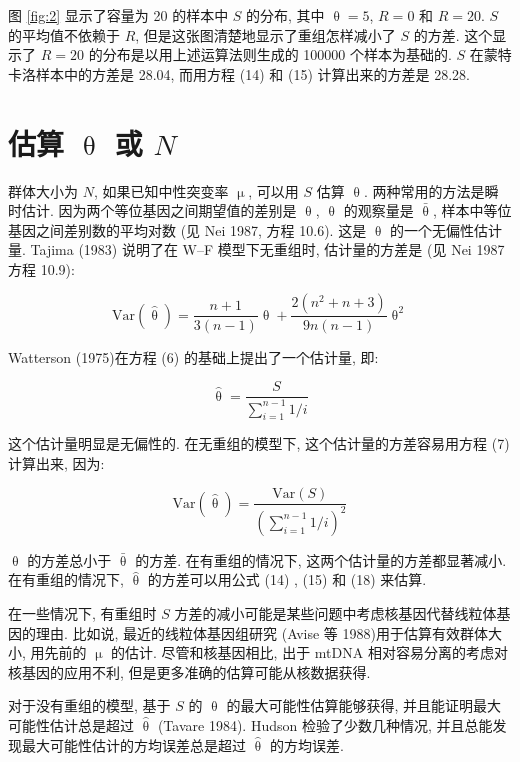 \documentclass[
    12pt,%
    ]{article}
\begin{document}
图 \ref{fig:2} 显示了容量为 20 的样本中 $S$ 的分布, 其中 $\uptheta =5$, $R=0$ 和 $R=20$. $S$ 的平均值不依赖于
$R$, 但是这张图清楚地显示了重组怎样减小了 $S$ 的方差. 这个显示了 $R=20$ 的分布是以用上述运算法则生成的 100000
个样本为基础的. $S$ 在蒙特卡洛样本中的方差是 28.04, 而用方程 (14) 和 (15) 计算出来的方差是 28.28.

\section{估算 $\uptheta$ 或 $N$}

群体大小为 $N$, 如果已知中性突变率 $\upmu$, 可以用 $S$ 估算 $\uptheta$. 两种常用的方法是瞬时估计.
因为两个等位基因之间期望值的差别是 $\uptheta$, $\uptheta$ 的观察量是 $\overset{‾}{\uptheta}$,
样本中等位基因之间差别数的平均对数 (见 Nei 1987, 方程 10.6). 这是 $\uptheta$ 的一个无偏性估计量. Tajima (1983) 说明了在
W--F 模型下无重组时, 估计量的方差是 (见 Nei 1987 方程 10.9):

\begin{equation} \label{eq:16}
    \text{Var}(\hat{\uptheta})=\frac{n+1}{3(n-1)}\uptheta + \frac{2(n^{2}+n+3)}{9n(n-1)}\uptheta^{2}
\end{equation}

Watterson (1975)在方程 (6) 的基础上提出了一个估计量, 即:

\begin{equation} \label{eq:17}
    \hat{\uptheta}=\frac{S}{\sum_{i=1}^{n-1}1/i}
\end{equation}

这个估计量明显是无偏性的. 在无重组的模型下, 这个估计量的方差容易用方程 (7) 计算出来, 因为:

\begin{equation} \label{eq:18}
    \text{Var}(\hat{\uptheta})=\frac{\text{Var}(S)}{\left( \sum_{i=1}^{n-1} 1/i \right)^{2}}
\end{equation}

$\uptheta$ 的方差总小于 $\overset{‾}{\uptheta}$ 的方差. 在有重组的情况下, 这两个估计量的方差都显著减小.
在有重组的情况下, $\hat{\uptheta}$ 的方差可以用公式 (14) , (15) 和 (18) 来估算.

在一些情况下, 有重组时 $S$ 方差的减小可能是某些问题中考虑核基因代替线粒体基因的理由. 比如说, 最近的线粒体基因组研究
(Avise 等 1988)用于估算有效群体大小, 用先前的 $\upmu$ 的估计. 尽管和核基因相比, 出于 mtDNA
相对容易分离的考虑对核基因的应用不利, 但是更多准确的估算可能从核数据获得.

对于没有重组的模型, 基于 $S$ 的 $\uptheta$ 的最大可能性估算能够获得, 并且能证明最大可能性估计总是超过 $\hat{\uptheta}$
(Tavare 1984). Hudson 检验了少数几种情况, 并且总能发现最大可能性估计的方均误差总是超过 $\hat{\uptheta}$ 的方均误差.
\end{document}
